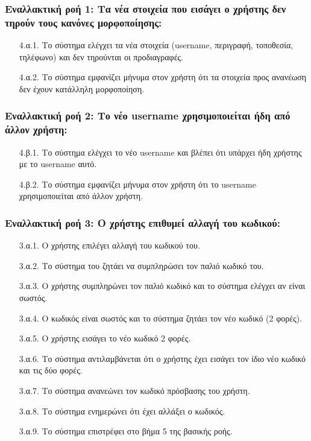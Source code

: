\documentclass[12pt,a4paper]{article}
\begin{document}
\subsubsection*{Εναλλακτική ροή 1: Τα νέα στοιχεία που εισάγει ο χρήστης δεν τηρούν τους κανόνες μορφοποίησης:}
\begin{enumerate}
    \item [4.α.1.] Το σύστημα ελέγχει τα νέα στοιχεία (username, περιγραφή, τοποθεσία, τηλέφωνο) και δεν τηρούνται οι προδιαγραφές.
    \item [4.α.2.] Το σύστημα εμφανίζει μήνυμα στον χρήστη ότι τα στοιχεία προς ανανέωση δεν έχουν κατάλληλη μορφοποίηση.
\end{enumerate}

\subsubsection*{Εναλλακτική ροή 2: Το νέο username χρησιμοποιείται ήδη από άλλον χρήστη:}
\begin{enumerate}
    \item [4.β.1.] Το σύστημα ελέγχει το νέο username και βλέπει ότι υπάρχει ήδη χρήστης με το username αυτό. 
    \item [4.β.2.] Το σύστημα εμφανίζει μήνυμα στον χρήστη ότι το username χρησιμοποιείται από άλλον χρήστη.  
\end{enumerate}

\subsubsection*{Εναλλακτική ροή 3: Ο χρήστης επιθυμεί αλλαγή του κωδικού:}
\begin{enumerate}
    \item [3.α.1.] Ο χρήστης επιλέγει αλλαγή του κωδικού του. 
    \item [3.α.2.] Το σύστημα του ζητάει να συμπληρώσει τον παλιό κωδικό του.
    \item [3.α.3.] Ο χρήστης συμπληρώνει τον παλιό κωδικό και το σύστημα ελέγχει αν είναι σωστός.
    \item [3.α.4.] Ο κωδικός είναι σωστός και το σύστημα ζητάει τον νέο κωδικό (2 φορές).
    \item [3.α.5.] Ο χρήστης εισάγει το νέο κωδικό 2 φορές.
    \item [3.α.6.] Το σύστημα αντιλαμβάνεται ότι ο χρήστης έχει εισάγει τον ίδιο νέο κωδικό και τις δύο φορές.
    \item [3.α.7.] Το σύστημα ανανεώνει τον κωδικό πρόσβασης του χρήστη.
    \item [3.α.8.] Το σύστημα ενημερώνει ότι έχει αλλάξει ο κωδικός.
    \item [3.α.9.] Το σύστημα επιστρέφει στο βήμα 5 της βασικής ροής.
\end{enumerate}
\end{document}
